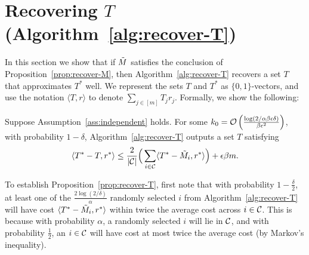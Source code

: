 \section{Recovering $T$ (Algorithm~\ref{alg:recover-T})}
\vskip -0.10in
\label{sec:approach-T}
\label{sec:rounding}

In this section we show that if $\tilde{M}$ satisfies the conclusion of 
Proposition~\ref{prop:recover-M}, then Algorithm~\ref{alg:recover-T} 
recovers a set $T$ that approximates $T^*$ well. We represent the sets $T$ and $T^*$ 
as $\{0,1\}$-vectors, and use the notation $\langle T, r \rangle$ 
to denote $\sum_{j \in [m]} T_jr_j$. Formally, we show the following:
\begin{proposition}
\label{prop:recover-T}
Suppose Assumption~\ref{ass:independent} holds. For some 
$k_0 = \mathcal{O}\left( \frac{\log(2/\alpha\beta\epsilon\delta)}{\beta\epsilon^2} \right)$, 
with probability $1-\delta$, Algorithm~\ref{alg:recover-T} outputs a set $T$ satisfying 
\begin{equation}
\label{eq:recover-T}
\langle T^* - T, r^* \rangle  \leq \frac{2}{|\mathcal{C}|}\Big(\sum_{i \in \mathcal{C}} \langle T^* - \tilde{M}_{i}, r^* \rangle\Big) + \epsilon\beta m.
\end{equation}
\end{proposition}
To establish Proposition~\ref{prop:recover-T}, 
first note that with probability $1-\frac{\delta}{2}$, 
at least one of the $\frac{2\log(2/\delta)}{\alpha}$ randomly selected 
$i$ from Algorithm~\ref{alg:recover-T} will have cost $\langle T^* - \tilde{M}_i, r^* \rangle$ 
within twice the average cost across $i \in \mathcal{C}$. This 
is because with probability $\alpha$, a randomly selected 
$i$ will lie in $\mathcal{C}$, and with probability $\frac{1}{2}$, 
an $i \in \mathcal{C}$ will have cost at 
most twice the average cost (by Markov's inequality).

